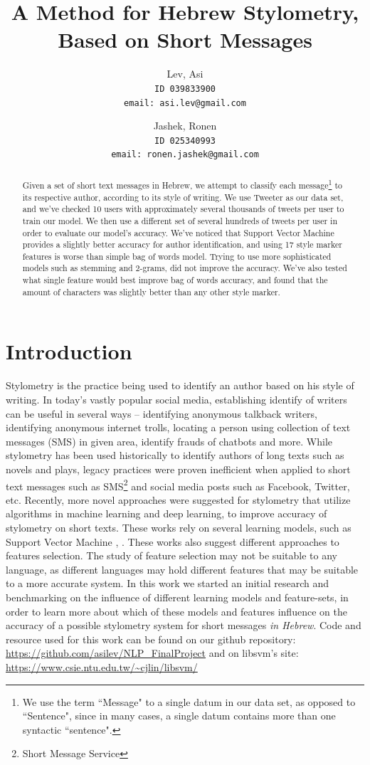 \documentclass[a4paper]{article}
\author{Lev, Asi\\
	\texttt{ID 039833900}\\
	\texttt{email: asi.lev@gmail.com}
\and
	Jashek, Ronen\\
	\texttt{ID 025340993}\\
	\texttt{email: ronen.jashek@gmail.com}	
}
\title{A Method for Hebrew Stylometry, Based on Short Messages}
\date{}
\begin{document}
\maketitle
\begin{abstract}

Given a set of short text messages in Hebrew, we attempt to classify each message\footnote{We use the term ``Message" to a single datum in our data set, as opposed to ``Sentence", since in many cases, a single datum contains more than one syntactic ``sentence".} to its respective author, according to its style of writing.
We use Tweeter as our data set, and we've checked 10 users with approximately several thousands of tweets per user to train our model.
We then use a different set of several hundreds of tweets per user in order to evaluate our model's accuracy.
We've noticed that Support Vector Machine provides a slightly better accuracy for author identification, and using 17 style marker features is worse than simple bag of words model. Trying to use more sophisticated models such as stemming and 2-grams, did not improve the accuracy. We've also tested what single feature would best improve bag of words accuracy, and found that the amount of characters was slightly better than any other style marker.
\end{abstract}
\section{Introduction}

Stylometry is the practice being used to identify an author based on his style of writing. In today's vastly popular social media, establishing identify of writers can be useful in several ways – identifying anonymous talkback writers, identifying anonymous internet trolls, locating a person using collection of text messages (SMS) in given area, identify frauds of chatbots and more.
While stylometry has been used historically to identify authors of long texts such as novels and plays, legacy practices were proven inefficient when applied to short text messages such as SMS\footnote{Short Message Service} and social media posts such as Facebook, Twitter, etc. \cite{rachel}
Recently, more novel approaches were suggested for stylometry that utilize algorithms in machine learning and deep learning, to improve accuracy of stylometry on short texts.
These works rely on several learning models, such as Support Vector Machine \cite{rachel}, \cite{schwartz}.
These works also suggest different approaches to features selection. The study of feature selection may not be suitable to any language, as different languages may hold different features that may be suitable to a more accurate system.
In this work we started an initial research and benchmarking on the influence of different learning models and feature-sets, in order to learn more about which of these models and features influence on the accuracy of a possible stylometry system for short messages \emph{in Hebrew}.
Code and resource used for this work can be found on our github repository: \url{https://github.com/asilev/NLP\_FinalProject} and on libsvm's site: \url{https://www.csie.ntu.edu.tw/~cjlin/libsvm/} \cite{chang}
\end{document}
